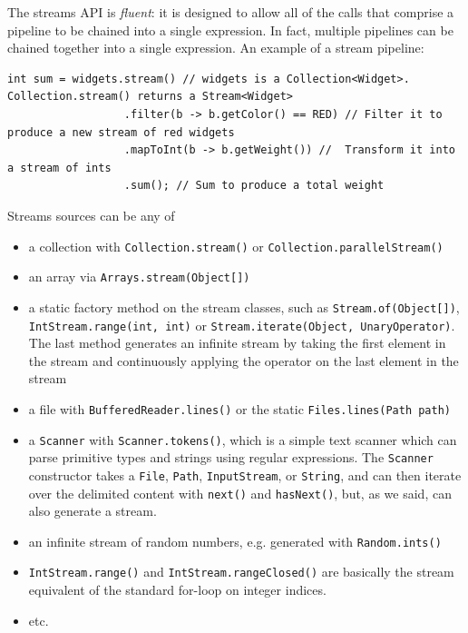 \documentclass[table, xcdraw]{article}%
\begin{document}
The streams API is \emph{fluent}: it is designed to allow all of the calls that comprise a pipeline to be chained into a single expression. In fact, multiple pipelines can be chained together into a single expression. An example of a stream pipeline:

\begin{verbatim}
int sum = widgets.stream() // widgets is a Collection<Widget>. Collection.stream() returns a Stream<Widget>
                  .filter(b -> b.getColor() == RED) // Filter it to produce a new stream of red widgets
                  .mapToInt(b -> b.getWeight()) //  Transform it into a stream of ints
                  .sum(); // Sum to produce a total weight
\end{verbatim}

Streams sources can be any of

\begin{itemize}
    \item a collection with \texttt{Collection.stream()} or \texttt{Collection.parallelStream()}
    \item an array via \texttt{Arrays.stream(Object[])}
    \item a static factory method on the stream classes, such as \texttt{Stream.of(Object[])}, \texttt{IntStream.range(int, int)} or \texttt{Stream.iterate(Object, UnaryOperator)}. The last method generates an infinite stream by taking the first element in the stream and continuously applying the operator on the last element in the stream
    \item a file with \texttt{BufferedReader.lines()} or the static \texttt{Files.lines(Path path)}
    \item a \texttt{Scanner} with \texttt{Scanner.tokens()}, which is a simple text scanner which can parse primitive types and strings using regular expressions. The \texttt{Scanner} constructor takes a \texttt{File}, \texttt{Path}, \texttt{InputStream}, or \texttt{String}, and can then iterate over the delimited content with \texttt{next()} and \texttt{hasNext()}, but, as we said, can also generate a stream.
    \item an infinite stream of random numbers, e.g. generated with \texttt{Random.ints()}
    \item \texttt{IntStream.range()} and \texttt{IntStream.rangeClosed()} are basically the stream equivalent of the standard for-loop on integer indices.
    \item etc.
\end{itemize}
\end{document}
